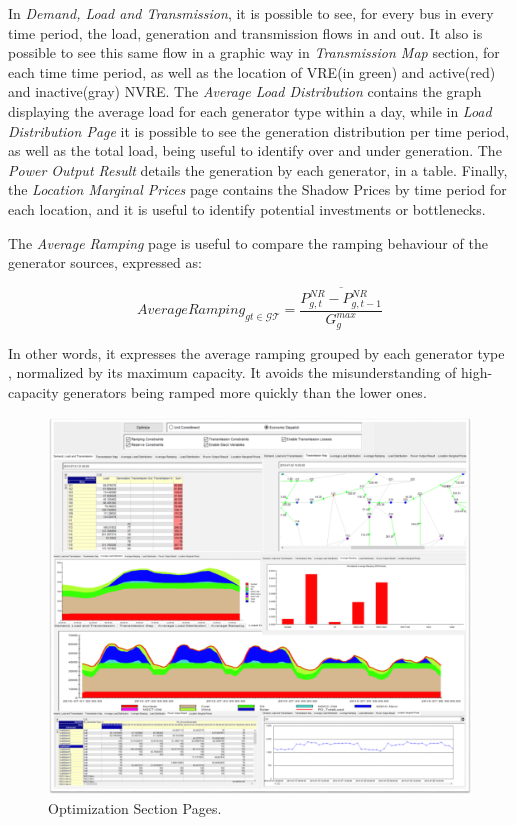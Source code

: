\documentclass[12pt,LUDisStyle,twosided]{book}
\newcommand{\mc}{\mathcal}
\begin{document}
In \textit{Demand, Load and Transmission}, it is possible to see, for every bus in every time period, the load, generation and transmission flows in and out. It also is possible to see this same flow in a graphic way in \textit{Transmission Map} section, for each time time period, as well as the location of VRE(in green) and active(red) and inactive(gray) NVRE. The \textit{Average Load Distribution} contains the graph displaying the average load for each generator type within a day, while in \textit{Load Distribution Page} it is possible to see the generation distribution per time period, as well as the total load, being useful to identify over and under generation. The \textit{Power Output Result} details the generation by each generator, in a table. Finally, the \textit{Location Marginal Prices} page contains the Shadow Prices by time period for each location, and it is useful to identify potential investments or bottlenecks.

The \textit{Average Ramping} page is useful to compare the ramping behaviour of the generator sources, expressed as:

\begin{equation}
    AverageRamping_{gt \in \mc{GT}} = \overline{\dfrac{P^{NR}_{g,t} - P^{NR}_{g,t-1}}{G^{max}_{g}}}
\end{equation}

In other words, it expresses the average ramping grouped by each generator type , normalized by its maximum capacity. It avoids the misunderstanding of high-capacity generators being ramped more quickly than the lower ones.

\begin{figure}[H] 
	\begin{center}
		\includegraphics[width=\textwidth,height=\textheight,keepaspectratio]{aimmsOptimizationSectionPages.png}
	  	\caption{Optimization Section Pages.}
     	\label{fig:optimizationSectionPages}
	\end{center}
\end{figure}
\end{document}
